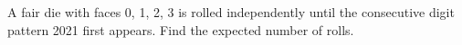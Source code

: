A fair die with faces 0, 1, 2, 3 is rolled independently until the consecutive digit pattern 2021 first appears. Find the expected number of rolls.
